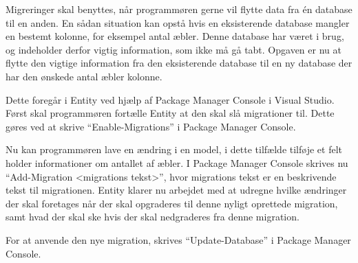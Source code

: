 Migreringer skal benyttes, når programmøren gerne vil flytte data fra én database til en anden. En sådan situation kan opstå hvis en eksisterende database mangler en bestemt kolonne, for eksempel antal æbler. Denne database har været i brug, og indeholder derfor vigtig information, som ikke må gå tabt. Opgaven er nu at flytte den vigtige information fra den eksisterende database til en ny database der har den ønskede antal æbler kolonne.

Dette foregår i Entity ved hjælp af Package Manager Console i Visual Studio. Først skal programmøren fortælle Entity at den skal slå migrationer til. Dette gøres ved at skrive \enquote{Enable-Migrations} i Package Manager Console.

Nu kan programmøren lave en ændring i en model, i dette tilfælde tilføje et felt holder informationer om antallet af æbler. I Package Manager Console skrives nu \enquote{Add-Migration <migrations tekst>}, hvor migrations tekst er en beskrivende tekst til migrationen. Entity klarer nu arbejdet med at udregne hvilke ændringer der skal foretages når der skal opgraderes til denne nyligt oprettede migration, samt hvad der skal ske hvis der skal nedgraderes fra denne migration.

For at anvende den nye migration, skrives \enquote{Update-Database} i Package Manager Console.
